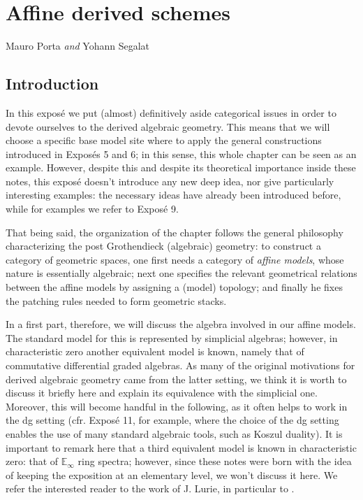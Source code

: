 \chapter{Affine derived schemes}


\begin{flushright}
Mauro Porta \emph{and} Yohann Segalat
\end{flushright}

\begin{refsection}

\section*{Introduction}

In this expos\'e we put (almost) definitively aside categorical issues in order to devote ourselves to the derived algebraic geometry. This means that we will choose a specific base model site where to apply the general constructions introduced in Expos\'es 5 and 6; in this sense, this whole chapter can be seen as an example. However, despite this and despite its theoretical importance inside these notes, this expos\'e doesn't introduce any new deep idea, nor give particularly interesting examples: the necessary ideas have already been introduced before, while for examples we refer to Expos\'e 9.

That being said, the organization of the chapter follows the general philosophy characterizing the post Grothendieck (algebraic) geometry: to construct a category of geometric spaces, one first needs a category of \emph{affine models}, whose nature is essentially algebraic; next one specifies the relevant geometrical relations between the affine models by assigning a (model) topology; and finally he fixes the patching rules needed to form geometric stacks.

In a first part, therefore, we will discuss the algebra involved in our affine models. The standard model for this is represented by simplicial algebras; however, in characteristic zero another equivalent model is known, namely that of commutative differential graded algebras. As many of the original motivations for derived algebraic geometry came from the latter setting, we think it is worth to discuss it briefly here and explain its equivalence with the simplicial one. Moreover, this will become handful in the following, as it often helps to work in the dg setting (cfr. Expos\'e 11, for example, where the choice of the dg setting enables the use of many standard algebraic tools, such as Koszul duality). It is important to remark here that a third equivalent model is known in characteristic zero: that of $\mathbb E_\infty$ ring spectra; however, since these notes were born with the idea of keeping the exposition at an elementary level, we won't discuss it here. We refer the interested reader to the work of J. Lurie, in particular to \cite[Chapters 1 and 8]{ha}.


\end{refsection}
